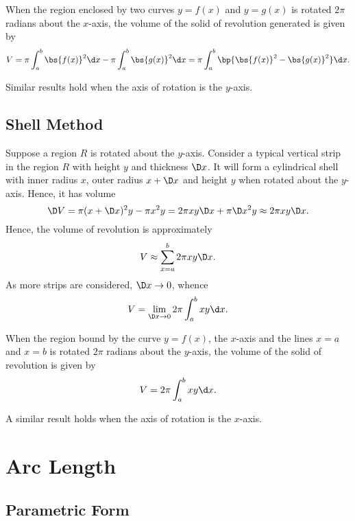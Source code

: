 \begin{proposition}
    When the region enclosed by two curves $y = f(x)$ and $y = g(x)$ is rotated $2\pi$ radians about the $x$-axis, the volume of the solid of revolution generated is given by \[V = \pi \int_a^b \bs{f(x)}^2 \d x - \pi \int_a^b \bs{g(x)}^2 \d x = \pi \int_a^b \bp{\bs{f(x)}^2 - \bs{g(x)}^2} \d x.\]
\end{proposition}

Similar results hold when the axis of rotation is the $y$-axis.

\subsection{Shell Method}

Suppose a region $R$ is rotated about the $y$-axis. Consider a typical vertical strip in the region $R$ with height $y$ and thickness $\D x$. It will form a cylindrical shell with inner radius $x$, outer radius $x + \D x$ and height $y$ when rotated about the $y$-axis. Hence, it has volume \[\D V = \pi (x + \D x)^2 y - \pi x^2 y = 2 \pi xy \D x + \pi \D x^2 y \approx 2 \pi xy \D x.\] Hence, the volume of revolution is approximately \[V \approx \sum_{x = a}^b 2 \pi xy \D x.\] As more strips are considered, $\D x \to 0$, whence \[V = \lim_{\D x \to 0} 2\pi \int_a^b xy \d x.\]

\begin{proposition}
    When the region bound by the curve $y = f(x)$, the $x$-axis and the lines $x = a$ and $x = b$ is rotated $2\pi$ radians about the $y$-axis, the volume of the solid of revolution is given by \[V = 2\pi \int_a^b xy \d x.\]
\end{proposition}

A similar result holds when the axis of rotation is the $x$-axis.

\section{Arc Length}

\subsection{Parametric Form}

